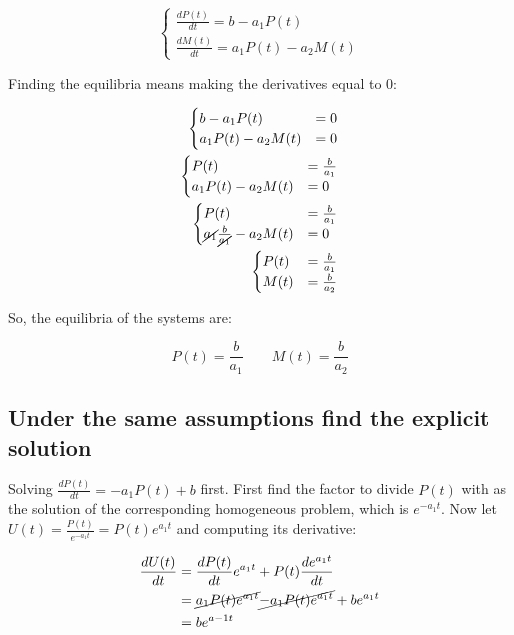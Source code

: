   $$\begin{cases}
    \frac{dP(t)}{dt} = b - a_1P(t)\\
    \frac{dM(t)}{dt} = a_1P(t) - a_2M(t)
  \end{cases}$$

  Finding the equilibria means making the derivatives equal to $0$:

  \begin{align*}
    \begin{cases}
      b - a_1P(t) &= 0\\
      a_1P(t) - a_2M(t) &=0\\
    \end{cases}\\
    \begin{cases}
      P(t) &= \frac{b}{a_1}\\
      a_1P(t) - a_2M(t) &=0\\
    \end{cases}\\
    \begin{cases}
      P(t) &= \frac{b}{a_1}\\
      \cancel{a_1}\frac{b}{\cancel{a_1}} - a_2M(t) &=0\\
    \end{cases}\\
    \begin{cases}
      P(t) &= \frac{b}{a_1}\\
      M(t) &=\frac{b}{a_2}\\
    \end{cases}\\
  \end{align*}

  So, the equilibria of the systems are:

  $$P(t) = \frac{b}{a_1}\qquad M(t) = \frac{b}{a_2}$$

  \subsection{Under the same assumptions find the explicit solution}
  Solving $\frac{dP(t)}{dt} = -a_1P(t) + b$ first.
  First find the factor to divide $P(t)$ with as the solution of the corresponding homogeneous problem, which is $e^{-a_1t}$.
  Now let $U(t) = \frac{P(t)}{e^{-a_1t}} = P(t)e^{a_1t}$ and computing its derivative:

  \begin{align*}
    \frac{dU(t)}{dt} &= \frac{dP(t)}{dt}e^{a_1t} + P(t)\frac{de^{a_1t}}{dt}\\
                     &= \cancel{a_1P(t)e^{a_1t}} \cancel{- a_1P(t)e^{a_1t}} + be^{a_1t}\\
                     &= be^{a-1t}
  \end{align*}


